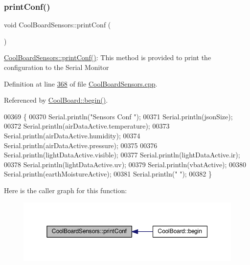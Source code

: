 \subsubsection{\texorpdfstring{print\+Conf()}{printConf()}}
{\footnotesize\ttfamily void Cool\+Board\+Sensors\+::print\+Conf (\begin{DoxyParamCaption}{ }\end{DoxyParamCaption})}

\hyperlink{class_cool_board_sensors_af6fd79505815b204c178617ecf54c873}{Cool\+Board\+Sensors\+::print\+Conf()}\+: This method is provided to print the configuration to the Serial Monitor 

Definition at line \hyperlink{_cool_board_sensors_8cpp_source_l00368}{368} of file \hyperlink{_cool_board_sensors_8cpp_source}{Cool\+Board\+Sensors.\+cpp}.



Referenced by \hyperlink{_cool_board_8cpp_source_l00021}{Cool\+Board\+::begin()}.


\begin{DoxyCode}
00369 \{
00370     Serial.println(\textcolor{stringliteral}{"Sensors Conf "});
00371     Serial.println(jsonSize);
00372     Serial.println(airDataActive.temperature);
00373     Serial.println(airDataActive.humidity);
00374     Serial.println(airDataActive.pressure);
00375 
00376     Serial.println(lightDataActive.visible);
00377     Serial.println(lightDataActive.ir);
00378     Serial.println(lightDataActive.uv);
00379     Serial.println(vbatActive);
00380     Serial.println(earthMoistureActive);
00381     Serial.println(\textcolor{stringliteral}{" "});
00382 \}
\end{DoxyCode}
Here is the caller graph for this function\+:
\nopagebreak
\begin{figure}[H]
\begin{center}
\leavevmode
\includegraphics[width=350pt]{class_cool_board_sensors_af6fd79505815b204c178617ecf54c873_icgraph}
\end{center}
\end{figure}
\mbox{\label{class_cool_board_sensors_a91badb2539d91fda8679f2a597874c48}} 
